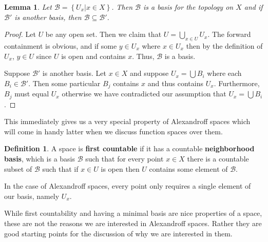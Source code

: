 \documentclass[paper=a4, fontsize=11pt]{scrartcl} %
\numberwithin{equation}{section} %
\numberwithin{figure}{section} %
\numberwithin{table}{section} %
\newtheorem{lemma}[theorem]{Lemma}
\theoremstyle{definition}
\newtheorem{definition}{Definition}[section]
\theoremstyle{remark}
\DeclareMathOperator{\Union}{\mathop{\bigcup}}
\begin{document}
\begin{lemma}
  Let $\mathcal{B}=\left\{ U_x|x\in X \right\}$.
  Then $\mathcal{B}$ is a basis for the topology on $X$ and if $\mathcal{B}'$ is another basis, then $\mathcal{B}\subseteq \mathcal{B}'$.
  
\end{lemma}
\begin{proof}
  Let $U$ be any open set.
  Then we claim that $U= \Union \limits_{x\in U} U_x$.
  The forward containment is obvious, and if some $y\in U_x$ where $x\in U_x$ then by the definition of $U_x$, $y\in U$ since $U$ is open and contains $x$.
  Thus, $\mathcal{B}$ is a basis.


  Suppose $\mathcal{B}'$ is another basis.
  Let $x\in X$ and suppose $U_x = \Union B_i$ where each $B_i \in \mathcal{B}'$.
  Then some particular $B_j$ contains $x$ and thus contains $U_x$.
  Furthermore, $B_j$ must equal $U_x$ otherwise we have contradicted our assumption that $U_x=\Union B_i$.

\end{proof}

This immediately gives us a very special property of Alexandroff spaces which will come in handy latter when we discuss function spaces over them.
\begin{definition}
  A space is \textbf{first countable} if it has a countable \textbf{neighborhood basis}, which is a basis $\mathcal{B}$ such that for every point $x\in X$ there is a countable subset of $\mathcal{B}$ such that if $x\in U$ is open then $U$ contains some element of $\mathcal{B}$.
\end{definition}
In the case of Alexandroff spaces, every point only requires a single element of our basis, namely $U_x$.

While first countability and having a minimal basis are nice properties of a space, these are not the reasons we are interested in Alexandroff spaces. Rather they are good starting points for the discussion of why we are interested in them.
\end{document}
